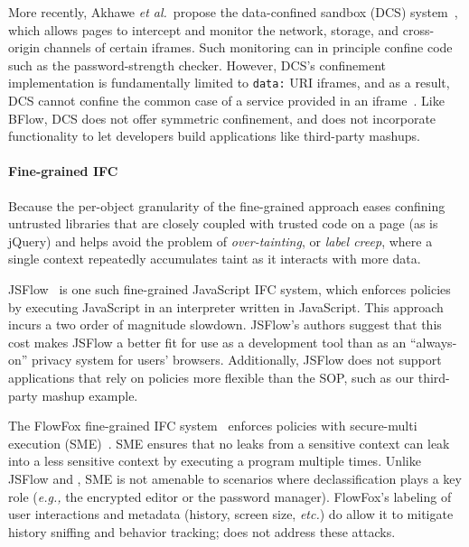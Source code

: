 More recently, Akhawe \emph{et al.}~propose the data-confined sandbox
(DCS) system~\cite{Akhawe2013}, which allows pages to intercept and
monitor the network, storage, and cross-origin channels of certain
iframes.
%
Such monitoring can in principle confine code such as the
password-strength checker.
%
However, DCS's confinement implementation is fundamentally limited to
\verb|data:| URI iframes, and as a result, DCS cannot confine the
common case of a service provided in an iframe~\cite{postman}.
%
Like BFlow, DCS does not offer symmetric confinement, and does
not incorporate functionality to let developers build
applications like third-party mashups.
%

\paragraph{Fine-grained IFC}
Because the per-object granularity of the fine-grained approach eases
confining untrusted libraries that are closely coupled with trusted
code on a page (as is jQuery) and helps avoid the problem of
\emph{over-tainting}, or \emph{label creep}, where a single context
repeatedly accumulates taint as it interacts with more data.

JSFlow~\cite{JSFlow} is one such fine-grained JavaScript IFC system, which
enforces policies by executing JavaScript in an interpreter written in
JavaScript.
%
This approach incurs a two order of magnitude slowdown. JSFlow's
authors suggest that this cost makes JSFlow a better fit for use as a
development tool than as an ``always-on'' privacy system for users'
browsers.
%
Additionally, JSFlow does not support applications that rely on policies
more flexible than the SOP, such as our third-party mashup example.

The FlowFox fine-grained IFC system~\cite{DeGroef:2012} enforces
policies with secure-multi execution (SME)~\cite{Devriese:2010}. SME
ensures that no leaks from a sensitive context can leak into a less
sensitive context by executing a program multiple times.
%
Unlike JSFlow and \sys{}, SME is not amenable to
scenarios where declassification plays a key role (\emph{e.g.,} the encrypted
editor or the password manager).
%
FlowFox's labeling of user interactions and metadata (history, screen
size, \emph{etc.}) do allow it to mitigate history sniffing and
behavior tracking; \sys{} does not address these attacks.

